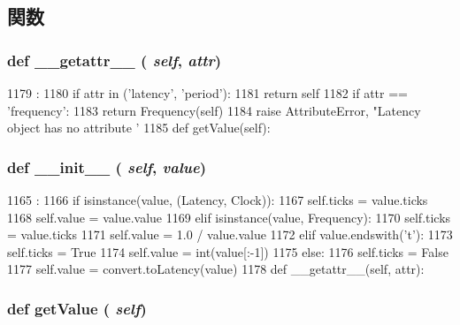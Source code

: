 \subsection{関数}
\hypertarget{classm5_1_1params_1_1Latency_a0a990b3ec3889d40889daca9ee5e4695}{
\subsubsection[{\_\-\_\-getattr\_\-\_\-}]{\setlength{\rightskip}{0pt plus 5cm}def \_\-\_\-getattr\_\-\_\- ( {\em self}, \/   {\em attr})}}
\label{classm5_1_1params_1_1Latency_a0a990b3ec3889d40889daca9ee5e4695}



\begin{DoxyCode}
1179                                :
1180         if attr in ('latency', 'period'):
1181             return self
1182         if attr == 'frequency':
1183             return Frequency(self)
1184         raise AttributeError, "Latency object has no attribute '%
1185 
    def getValue(self):
\end{DoxyCode}
\hypertarget{classm5_1_1params_1_1Latency_ac775ee34451fdfa742b318538164070e}{
\subsubsection[{\_\-\_\-init\_\-\_\-}]{\setlength{\rightskip}{0pt plus 5cm}def \_\-\_\-init\_\-\_\- ( {\em self}, \/   {\em value})}}
\label{classm5_1_1params_1_1Latency_ac775ee34451fdfa742b318538164070e}



\begin{DoxyCode}
1165                              :
1166         if isinstance(value, (Latency, Clock)):
1167             self.ticks = value.ticks
1168             self.value = value.value
1169         elif isinstance(value, Frequency):
1170             self.ticks = value.ticks
1171             self.value = 1.0 / value.value
1172         elif value.endswith('t'):
1173             self.ticks = True
1174             self.value = int(value[:-1])
1175         else:
1176             self.ticks = False
1177             self.value = convert.toLatency(value)
1178 
    def __getattr__(self, attr):
\end{DoxyCode}
\hypertarget{classm5_1_1params_1_1Latency_acc340fbd4335fa34f9d57fb454b28ed0}{
\subsubsection[{getValue}]{\setlength{\rightskip}{0pt plus 5cm}def getValue ( {\em self})}}
\label{classm5_1_1params_1_1Latency_acc340fbd4335fa34f9d57fb454b28ed0}


